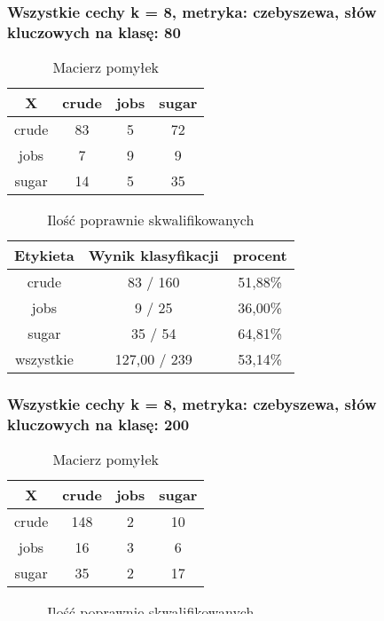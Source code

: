 \documentclass{classrep}
\begin{document}
\newpage
\subsubsection{Wszystkie cechy k = 8, metryka: czebyszewa, słów kluczowych na klasę: 80}
\begin{table}[h]
\centering
\begin{tabular}{|c|c|c|c|}
\hline
 X  & crude & jobs & sugar\\
\hline
crude & 83 & 5 & 72\\
\hline
jobs & 7 & 9 & 9\\
\hline
sugar & 14 & 5 & 35\\
\hline
\end{tabular}
\caption{Macierz pomyłek}\end{table}

\begin{table}[h]
\centering
\begin{tabular}{|c|c|c|}
\hline
Etykieta & Wynik klasyfikacji & procent\\
\hline
crude & 83 / 160 & 51,88\%\\
\hline
jobs & 9 / 25 & 36,00\%\\
\hline
sugar & 35 / 54 & 64,81\%\\
\hline
wszystkie & 127,00 / 239 & 53,14\%\\
\hline
\end{tabular}
\caption{Ilość poprawnie skwalifikowanych}\end{table}

\newpage
\subsubsection{Wszystkie cechy k = 8, metryka: czebyszewa, słów kluczowych na klasę: 200}
\begin{table}[h]
\centering
\begin{tabular}{|c|c|c|c|}
\hline
 X  & crude & jobs & sugar\\
\hline
crude & 148 & 2 & 10\\
\hline
jobs & 16 & 3 & 6\\
\hline
sugar & 35 & 2 & 17\\
\hline
\end{tabular}
\caption{Macierz pomyłek}\end{table}

\begin{table}[h]
\centering
\begin{tabular}{|c|c|c|}
\hline
Etykieta & Wynik klasyfikacji & procent\\
\hline
crude & 148 / 160 & 92,50\%\\
\hline
jobs & 3 / 25 & 12,00\%\\
\hline
sugar & 17 / 54 & 31,48\%\\
\hline
wszystkie & 168,00 / 239 & 70,29\%\\
\hline
\end{tabular}
\caption{Ilość poprawnie skwalifikowanych}\end{table}
\end{document}
